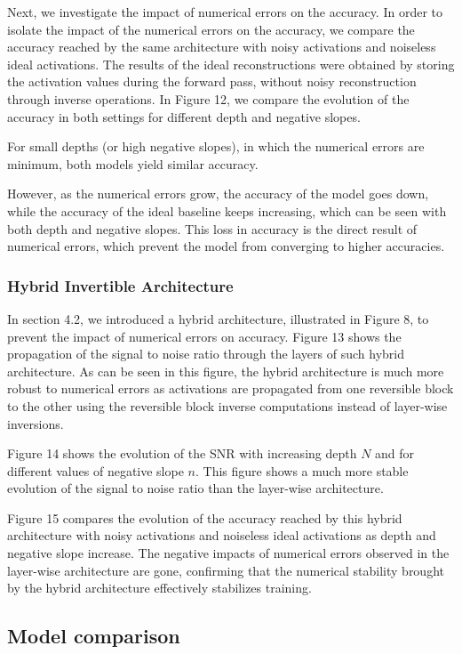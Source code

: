 \documentclass[twocolumn]{bmcart}
\begin{document}
Next, we investigate the impact of numerical errors on the accuracy.
In order to isolate the impact of the numerical errors on the accuracy, 
we compare the accuracy reached by the same architecture with noisy activations and noiseless ideal activations.
The results of the ideal reconstructions were obtained by storing the activation values during the forward pass,
without noisy reconstruction through inverse operations. 
In Figure 12, we compare the evolution of the accuracy in both settings for different depth and negative slopes.

For small depths (or high negative slopes), in which the numerical errors are minimum, both models yield similar accuracy.

However, as the numerical errors grow, the accuracy of the model goes down, 
while the accuracy of the ideal baseline keeps increasing,
which can be seen with both depth and negative slopes.
This loss in accuracy is the direct result of numerical errors, 
which prevent the model from converging to higher accuracies.

\subsubsection{Hybrid Invertible Architecture}

In section 4.2, we introduced a hybrid architecture,
illustrated in Figure 8, to prevent the impact of numerical errors on accuracy.
Figure 13 shows the propagation of the signal to noise ratio through the layers of such hybrid architecture.
As can be seen in this figure, the hybrid architecture is much more robust to numerical errors as activations 
are propagated from one reversible block to the other using the reversible block inverse computations instead of layer-wise inversions.

Figure 14 shows the evolution of the SNR with increasing depth $N$ and for different values of negative slope $n$.
This figure shows a much more stable evolution of the signal to noise ratio than the layer-wise architecture. 

Figure 15 compares the evolution of the accuracy reached by this hybrid architecture with noisy activations and noiseless ideal activations as depth and negative slope increase.
The negative impacts of numerical errors observed in the layer-wise architecture are gone,
confirming that the numerical stability brought by the hybrid architecture effectively stabilizes training.


\subsection{Model comparison}
\end{document}

